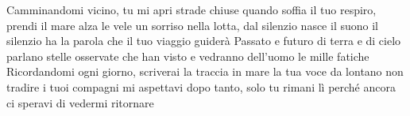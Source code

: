 \beginverse
Camminandomi vicino, tu mi apri strade chiuse
quando soffia il tuo respiro, prendi il mare alza le vele
un sorriso nella lotta, dal silenzio nasce il suono
il silenzio ha la parola che il tuo viaggio guiderà
\endverse
\beginchorus
Passato e futuro di terra e di cielo
parlano stelle osservate
che han visto e vedranno dell'uomo
le mille fatiche
\endchorus
\beginverse
Ricordandomi ogni giorno, scriverai la traccia in mare
la tua voce da lontano non tradire i tuoi compagni
mi aspettavi dopo tanto, solo tu rimani lì
perché ancora ci speravi di vedermi ritornare
\endverse
\endsong
